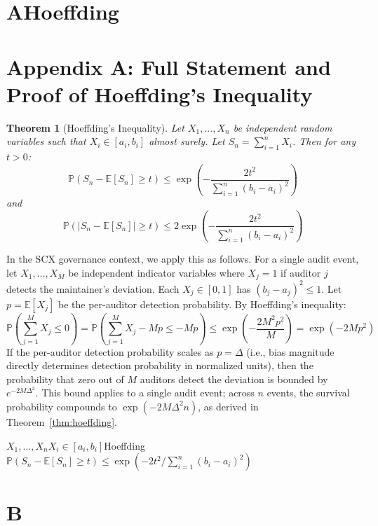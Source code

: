 \documentclass[12pt,a4paper]{article}
\newtheorem{theorem}{Theorem}[section]
\theoremstyle{remark}
\newcommand{\E}{\mathbb{E}}
\newcommand{\Pbb}{\mathbb{P}}
\begin{document}
\section{AHoeffding}
\section{Appendix A: Full Statement and Proof of Hoeffding's Inequality}

\begin{theorem}[Hoeffding's Inequality]\label{thm:hoeffding_full}
Let $X_1, \ldots, X_n$ be independent random variables such that $X_i \in [a_i, b_i]$
almost surely. Let $S_n = \sum_{i=1}^n X_i$. Then for any $t > 0$:
\begin{equation}
    \Pbb(S_n - \E[S_n] \geq t) \leq \exp\left(-\frac{2t^2}{\sum_{i=1}^n (b_i - a_i)^2}\right)
\end{equation}
and
\begin{equation}
    \Pbb(|S_n - \E[S_n]| \geq t) \leq 2\exp\left(-\frac{2t^2}{\sum_{i=1}^n (b_i - a_i)^2}\right)
\end{equation}
\end{theorem}

In the SCX governance context, we apply this as follows. For a single audit
event, let $X_1, \ldots, X_M$ be independent indicator variables where
$X_j = 1$ if auditor $j$ detects the maintainer's deviation. Each $X_j \in [0,1]$
has $(b_j - a_j)^2 \leq 1$. Let $p = \E[X_j]$ be the per-auditor detection
probability. By Hoeffding's inequality:
\begin{equation}
    \Pbb\left(\sum_{j=1}^{M} X_j \leq 0\right)
    = \Pbb\left(\sum_{j=1}^{M} X_j - Mp \leq -Mp\right)
    \leq \exp\left(-\frac{2M^2 p^2}{M}\right) = \exp(-2M p^2)
\end{equation}
If the per-auditor detection probability scales as $p = \Delta$ (i.e., bias
magnitude directly determines detection probability in normalized units),
then the probability that zero out of $M$ auditors detect the deviation is
bounded by $e^{-2M\Delta^2}$. This bound applies to a single audit event;
across $n$ events, the survival probability compounds to $\exp(-2M\Delta^2 n)$,
as derived in Theorem~\ref{thm:hoeffding}.

\noindent\textbf{}
$X_1, \ldots, X_n$$X_i \in [a_i, b_i]$Hoeffding
$\Pbb(S_n - \E[S_n] \geq t) \leq \exp(-2t^2 / \sum_{i=1}^n (b_i - a_i)^2)$

\section{B}
\end{document}
